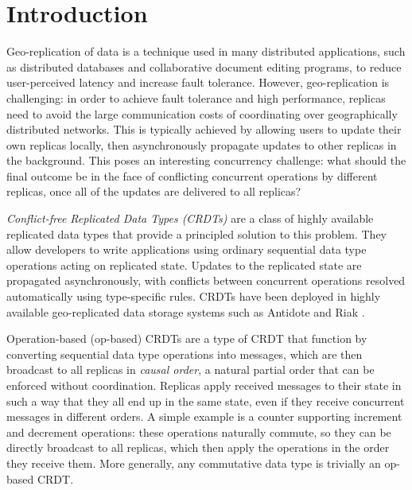 \documentclass[acmsmall,nonacm]{acmart}
\theoremstyle{plain}
\theoremstyle{definition}
\begin{document}


\maketitle

\section{Introduction}
Geo-replication of data is a technique used in many distributed applications, such as distributed databases and collaborative document editing programs, to reduce user-perceived latency and increase fault tolerance.  However, geo-replication is challenging: in order to achieve fault tolerance and high performance, replicas need to avoid the large communication costs of coordinating over geographically distributed networks.  This is typically achieved by allowing users to update their own replicas locally, then asynchronously propagate updates to other replicas in the background.  This poses an interesting concurrency challenge: what should the final outcome be in the face of conflicting concurrent operations by different replicas, once all of the updates are delivered to all replicas?

\textit{Conflict-free Replicated Data Types (CRDTs)} \cite{crdt_survey_2011, crdt_summary_2018} are a class of highly available replicated data types that provide a principled solution to this problem.  They allow developers to write applications using ordinary sequential data type operations acting on replicated state.  Updates to the replicated state are propagated asynchronously, with conflicts between concurrent operations resolved automatically using type-specific rules.  CRDTs have been deployed in highly available geo-replicated data storage systems such as Antidote \cite{antidote} and Riak \cite{riak_datatypes}.

Operation-based (op-based) CRDTs \cite{crdt_survey_2011, crdt_summary_2018} are a type of CRDT that function by converting sequential data type operations into messages, which are then broadcast to all replicas in \textit{causal order}, a natural partial order that can be enforced without coordination.  Replicas apply received messages to their state in such a way that they all end up in the same state, even if they receive concurrent messages in different orders.  A simple example is a counter supporting increment and decrement operations: these operations naturally commute, so they can be directly broadcast to all replicas, which then apply the operations in the order they receive them.  More generally, any commutative data type is trivially an op-based CRDT.
\end{document}
